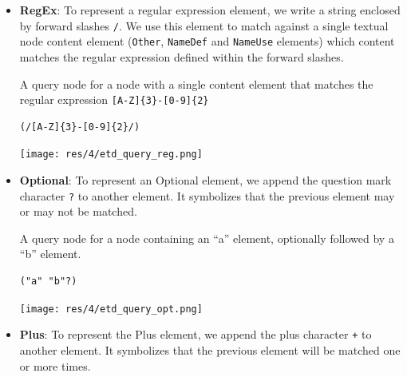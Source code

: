 \begin{chapterBody}
\begin{itemize}
    \item \textbf{RegEx}: To represent a regular expression element, we write
a string enclosed by forward slashes \texttt{/}.
We use this element to match against a single textual node content
element (\texttt{Other}, \texttt{NameDef} and \texttt{NameUse} elements) which
content matches the regular expression defined within the forward slashes.

\begin{minipage}{.3\linewidth}
A query node for a node with a single content element that matches the
regular expression
\texttt{[A-Z]\{3\}-[0-9]\{2\}}
\end{minipage}
\hspace{.02\linewidth}
\begin{minipage}{.3\linewidth}
\begin{lstlisting}[language=etl]
(/[A-Z]{3}-[0-9]{2}/)
\end{lstlisting} 
\end{minipage}
\hspace{.02\linewidth}
\begin{minipage}{.3\linewidth}
\texttt{[image: res/4/etd\_query\_reg.png]}
\end{minipage}

    \item \textbf{Optional}: To represent an Optional element, we append
the question mark character \texttt{?} to another element.
It symbolizes that the previous element may or may not be matched.

\begin{minipage}{.3\linewidth}
A query node for a node containing an ``a'' element, optionally 
followed by a ``b'' element.
\end{minipage}
\hspace{.02\linewidth}
\begin{minipage}{.3\linewidth}
\begin{lstlisting}[language=etl]
("a" "b"?)
\end{lstlisting} 
\end{minipage}
\hspace{.02\linewidth}
\begin{minipage}{.3\linewidth}
\texttt{[image: res/4/etd\_query\_opt.png]}
\end{minipage}

    \item \textbf{Plus}: To represent the Plus element, we append the plus
character \texttt{+} to another element. It symbolizes that the previous element will be matched one or more times.


\end{itemize}
\end{chapterBody}
